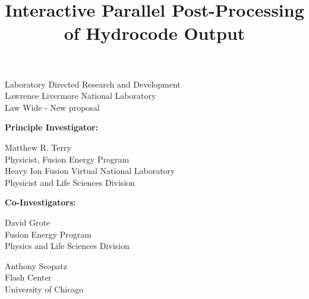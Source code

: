 \documentclass[letterpaper,12pt]{article}
\title{\color{red}Interactive Parallel Post-Processing of Hydrocode Output }
\author{}
\date{}
\begin{document}
\maketitle

\setlength{\parindent}{0pt}
\large
Laboratory Directed Research and Development \\
Lawrence Livermore National Laboratory \\
Law Wide - New proposal

\normalsize
\begin{multicols}{2}
\textbf{Principle Investigator:}
\columnbreak

Matthew R. Terry \\
Physicist, Fusion Energy Program \\
Heavy Ion Fusion Virtual National Laboratory \\
Physicist and Life Sciences Division

\end{multicols}


\textbf{Co-Investigators:}
\begin{multicols}{2}
	David Grote \\
	Fusion Energy Program \\
	Physics and Life Sciences Division\\
	\columnbreak
			
	Anthony Scopatz \\
	Flash Center \\
	University of Chicago \\
\end{multicols}




\end{document}
